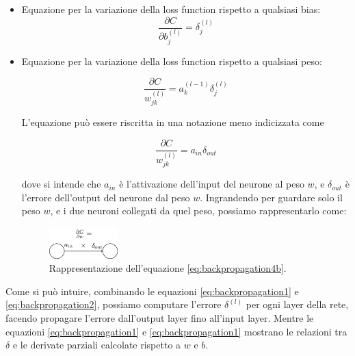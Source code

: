 \begin{itemize}
    \item  Equazione per la variazione della loss function rispetto a qualsiasi bias:
    \begin{equation}
        \frac{\partial C}{\partial b_{j}^{(l)}} = \delta_{j}^{(l)}
        \label{eq:backpropagation3}
    \end{equation}

    \item Equazione per la variazione della loss function rispetto a qualsiasi peso:

    \begin{equation}
        \frac{\partial C}{w_{jk}^{(l)}} = a_{k}^{(l-1)}\delta_{j}^{(l)}
        \label{eq:backpropagation4a}
    \end{equation}

    L'equazione può essere riscritta in una notazione meno indicizzata come

    \begin{equation}
        \frac{\partial C}{w_{jk}^{(l)}} = a_{in}\delta_{out}
        \label{eq:backpropagation4b}
    \end{equation}

    dove si intende che $a_{in}$ è l'attivazione dell'input del neurone al peso $w$, e $\delta_{out}$
    è l'errore dell'output del neurone dal peso $w$. Ingrandendo per guardare solo il peso $w$, 
    e i due neuroni collegati da quel peso, possiamo rappresentarlo come:

    \begin{figure}[H]
        \centering
        \includegraphics[width=0.25\textwidth]{Immagini/Generiche/tikz20.png}
        \caption{Rappresentazione dell'equazione \eqref{eq:backpropagation4b}.}
    \end{figure}

\end{itemize}


Come si può intuire, combinando le equazioni \eqref{eq:backpropagation1} e \eqref{eq:backpropagation2}, possiamo computare l'errore
$\delta^{(l)}$ per ogni layer della rete, facendo propagare l'errore dall'output layer fino all'input 
layer.
Mentre le equazioni \eqref{eq:backpropagation1} e \eqref{eq:backpropagation1} mostrano le relazioni 
tra $\delta$ e le derivate parziali calcolate rispetto a $w$ e $b$.

